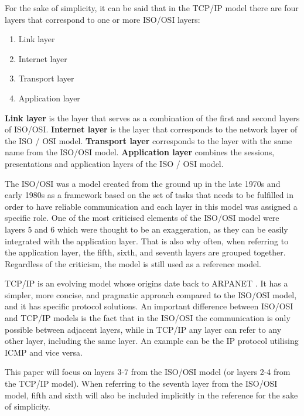 For the sake of simplicity, it can be said that in the TCP/IP model there are four layers that correspond to one or more ISO/OSI layers:
\begin{enumerate}
    \item Link layer
    \item Internet layer
    \item Transport layer
    \item Application layer
\end{enumerate}
\textbf{Link layer} is the layer that serves as a combination of the first and second layers of ISO/OSI. \textbf{Internet layer} is the layer that corresponds to the network layer of the ISO / OSI model. \textbf{Transport layer} corresponds to the layer with the same name from the ISO/OSI model. \textbf{Application layer} combines the sessions, presentations and application layers of the ISO / OSI model.

The ISO/OSI was a model created from the ground up in the late 1970s and early 1980s as a framework based on the set of tasks that needs to be fulfilled in order to have reliable communication and each layer in this model was assigned a specific role. One of the most criticised elements of the ISO/OSI model were layers 5 and 6 which were thought to be an exaggeration, as they can be easily integrated with the application layer. That is also why often, when referring to the application layer, the fifth, sixth, and seventh layers are grouped together. Regardless of the criticism, the model is still used as a reference model.

TCP/IP is an evolving model whose origins date back to ARPANET \cite{rfc1}. It has a simpler, more concise, and pragmatic approach compared to the ISO/OSI model, and it has specific protocol solutions. An important difference between ISO/OSI and TCP/IP models is the fact that in the ISO/OSI the communication is only possible between adjacent layers, while in TCP/IP any layer can refer to any other layer, including the same layer. An example can be the IP protocol utilising ICMP and vice versa.

This paper will focus on layers 3-7 from the ISO/OSI model (or layers 2-4 from the TCP/IP model). When referring to the seventh layer from the ISO/OSI model, fifth and sixth will also be included implicitly in the reference for the sake of simplicity.


